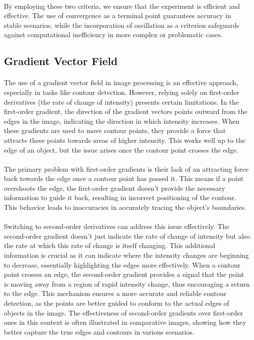 \documentclass[12pt,a4paper]{report}
\begin{document}
\paragraph*{}
By employing these two criteria, we ensure that the experiment is efficient and effective. The use of convergence as a terminal point guarantees accuracy in stable scenarios, while the incorporation of oscillation as a criterion safeguards against computational inefficiency in more complex or problematic cases.

\subsection{Gradient Vector Field}
\paragraph*{}
The use of a gradient vector field in image processing is an effective approach, especially in tasks like contour detection. However, relying solely on first-order derivatives (the rate of change of intensity) presents certain limitations. In the first-order gradient, the direction of the gradient vectors points outward from the edges in the image, indicating the direction in which intensity increases. When these gradients are used to move contour points, they provide a force that attracts these points towards areas of higher intensity. This works well up to the edge of an object, but the issue arises once the contour point crosses the edge.
\paragraph*{}
The primary problem with first-order gradients is their lack of an attracting force back towards the edge once a contour point has passed it. This means if a point overshoots the edge, the first-order gradient doesn't provide the necessary information to guide it back, resulting in incorrect positioning of the contour. This behavior leads to inaccuracies in accurately tracing the object's boundaries.
\paragraph*{}
Switching to second-order derivatives can address this issue effectively. The second-order gradient doesn't just indicate the rate of change of intensity but also the rate at which this rate of change is itself changing. This additional information is crucial as it can indicate where the intensity changes are beginning to decrease, essentially highlighting the edges more effectively. When a contour point crosses an edge, the second-order gradient provides a signal that the point is moving away from a region of rapid intensity change, thus encouraging a return to the edge. This mechanism ensures a more accurate and reliable contour detection, as the points are better guided to conform to the actual edges of objects in the image. The effectiveness of second-order gradients over first-order ones in this context is often illustrated in comparative images, showing how they better capture the true edges and contours in various scenarios.
\end{document}

